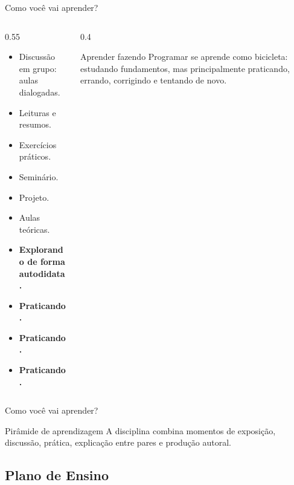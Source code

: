 \begin{frame}{Como você vai aprender?}
\begin{columns}[T,onlytextwidth]
\begin{column}{0.55\textwidth}
\begin{itemize}
  \item Discussão em grupo: aulas dialogadas.
  \item Leituras e resumos.
  \item Exercícios práticos.
  \item Seminário.
  \item Projeto.
  \item Aulas teóricas.
  \item \textbf{Explorando de forma autodidata.}
  \item \textbf{Praticando.}
  \item \textbf{Praticando.}
  \item \textbf{Praticando.}
\end{itemize}
\end{column}
\begin{column}{0.4\textwidth}
\begin{block}{Aprender fazendo}
Programar se aprende como bicicleta: estudando fundamentos, mas principalmente praticando, errando, corrigindo e tentando de novo.
\end{block}
\end{column}
\end{columns}
\end{frame}

\begin{frame}{Como você vai aprender?}
\begin{block}{Pirâmide de aprendizagem}
A disciplina combina momentos de exposição, discussão, prática, explicação entre pares e produção autoral.
\end{block}

\end{frame}

\subsection{Plano de Ensino}

